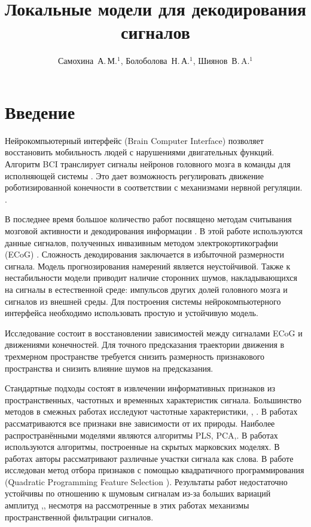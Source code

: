 \documentclass[12pt,twoside]{article}
\title
    [Исследование свойств локальных моделей при пространственном декодировании сигналов головного мозга] 
    {Локальные модели для декодирования сигналов}
\author
    [Самохина~А.\,М.] %
    {Самохина~А.\,М.$^1$, Болоболова~Н.\,А.$^1$, Шиянов~В.\,A.$^1$} %
\begin{document}
\maketitle
\bigskip
\bigskip
\bigskip
\bigskip
\maketitleSecondary

\section{Введение}
Нейрокомпьютерный интерфейс (Brain Computer Interface) \cite{Morishita2014} позволяет восстановить мобильность людей с нарушениями двигательных функций.  Алгоритм BCI транслирует сигналы нейронов головного мозга в команды для исполняющей системы \cite{Morishita2014}. Это дает возможность регулировать движение роботизированной конечности в соответствии с механизмами нервной регуляции. \cite{Donoghue2008}. 


В последнее время большое количество работ посвящено методам считывания мозговой активности и декодирования информации \cite{Hu2018}\cite{Song2017}\cite{Loza2017}\cite{Eliseyev2016}\cite{Gaglianese2016}\cite{Bundy2016}\cite{Morishita2014}.
В этой работе используются данные сигналов, полученных инвазивным методом электрокортикографии (ECoG) \cite{Sirven2014}. Сложность декодирования заключается в избыточной размерности сигнала. Модель прогнозирования намерений является неустойчивой. Также к нестабильности модели приводит наличие сторонних шумов, накладывающихся на сигналы в естественной среде: импульсов других долей головного мозга и сигналов из внешней среды.  Для построения системы нейрокомпьютерного интерфейса необходимо использовать простую и устойчивую модель. 


Исследование состоит в восстановлении зависимостей между сигналами ECoG и движениями конечностей. Для точного предсказания траектории движения в трехмерном пространстве требуется снизить размерность признакового пространства и снизить влияние шумов на предсказания.


Стандартные подходы состоят в извлечении информативных признаков из пространственных, частотных и временных характеристик сигнала\cite{Morishita2014}\cite{Alexander2013}. Большинство методов в смежных работах исследуют частотные характеристики\cite{Chin2007}, \cite{Eliseyev2014}, \cite{Loza2017}. В работах \cite{Eliseyev2016}\cite{Motrenko2018} рассматриваются все признаки вне зависимости от их природы. Наиболее распространёнными моделями являются алгоритмы PLS\cite{Rosipal2006}\cite{Eliseyev2016}, PCA\cite{Zhao2010},\cite{Song2017}. В работах \cite{Zhao2014} используются алгоритмы, построенные на скрытых марковских моделях. В  работах \cite{Loza2017}\cite{Song2017} авторы рассматривают различные участки сигнала как слова. В работе \cite{Motrenko_2018} исследован метод отбора признаков с помощью квадратичного программирования (Quadratic Programming Feature Selection \cite{rodriguez2010quadratic}). Результаты работ недостаточно устойчивы по отношению к шумовым сигналам из-за больших вариаций амплитуд \cite{Eliseyev2014},\cite{Song2017}, несмотря на рассмотренные в этих работах механизмы пространственной фильтрации сигналов.
\end{document}
